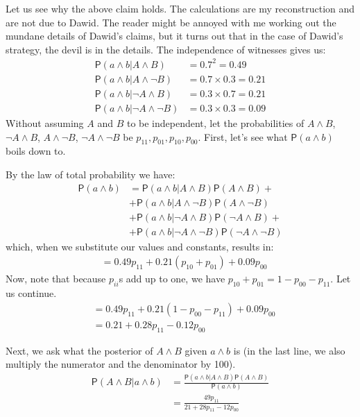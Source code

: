 \documentclass[
  10pt,
  dvipsnames,enabledeprecatedfontcommands]{scrartcl}
\newcommand{\n}{\neg}
\newcommand{\et}{\wedge}
\newcommand{\pr}[1]{\mathsf{P}(#1)}
\begin{document}
Let us see why the above claim holds. The calculations are my
reconstruction and are not due to Dawid. The reader might be annoyed
with me working out the mundane details of Dawid's claims, but it turns
out that in the case of Dawid's strategy, the devil is in the details.
The independence of witnesses gives us: \begin{align*}
 \pr{a \et b \vert A\et B}& =0.7^2=0.49\\
 \pr{a \et b \vert A\et \n B}& =  0.7\times 0.3=0.21\\
 \pr{a \et b \vert \n A\et B}& =  0.3\times 0.7=0.21\\
 \pr{a \et b \vert \n A\et \n B}& =  0.3\times 0.3=0.09
 \end{align*} Without assuming \(A\) and \(B\) to be independent, let
the probabilities of \(A\et B\), \(\n A\et B\), \(A\et \n B\),
\(\n A\et \n B\) be \(p_{11}, p_{01}, p_{10}, p_{00}\). First, let's see
what \(\pr{a\et b}\) boils down to.

By the law of total probability we have:
\begin{align}\label{eq:total_lower}
 \pr{a\et b} & = 
                     \pr{a\et b \vert A \et B}\pr{A\et B} + \\ &  \nonumber
                     +\pr{a\et b \vert A \et \n B}\pr{A\et \n B} \\ &  \nonumber
 + \pr{a\et b \vert \n A \et B}\pr{\n A\et B} + \\ & \nonumber
                     + \pr{a\et b \vert \n A \et \n B}\pr{\n A\et \n B}
 \end{align} \noindent which, when we substitute our values and
constants, results in: \begin{align*}
                     & = 0.49p_{11}+0.21(p_{10}+p_{01})+0.09p_{00}
 \end{align*} Now, note that because \(p_{ii}\)s add up to one, we have
\(p_{10}+p_{01}=1-p_{00}-p_{11}\). Let us continue. \begin{align*}
    & = 0.49p_{11}+0.21(1-p_{00}-p_{11})+0.09p_{00} \\
                     & = 0.21+0.28p_{11}-0.12p_{00}
 \end{align*}

Next, we ask what the posterior of \(A\et B\) given \(a\et b\) is (in
the last line, we also multiply the numerator and the denominator by
100). \begin{align*}
 \pr{A\et B\vert a \et b} & =
         \frac{\pr{a\et b \vert A \et B}\pr{A\et B}}
             {\pr{a\et b}}\\
         & =
                     \frac{49p_{11}}
                           {21+28p_{11}-12p_{00}} 
         \end{align*}
\end{document}
